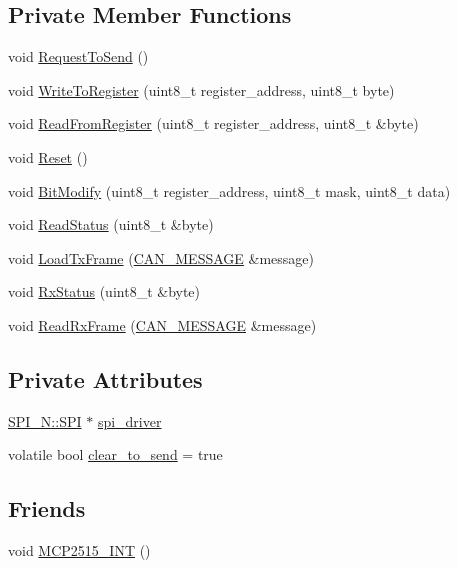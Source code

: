 \subsection*{Private Member Functions}
\begin{DoxyCompactItemize}
\item 
void \hyperlink{class_m_c_p2515_a5a218199ca1dfcb25cb95890bc0220fc}{Request\-To\-Send} ()
\item 
void \hyperlink{class_m_c_p2515_adbc005a5975b77b0aef74363f3832f9b}{Write\-To\-Register} (uint8\-\_\-t register\-\_\-address, uint8\-\_\-t byte)
\item 
void \hyperlink{class_m_c_p2515_a09ef6973daccbf868d89986e727cfa1b}{Read\-From\-Register} (uint8\-\_\-t register\-\_\-address, uint8\-\_\-t \&byte)
\item 
void \hyperlink{class_m_c_p2515_aa4d4138b984dc87116cf72ae104acb70}{Reset} ()
\item 
void \hyperlink{class_m_c_p2515_aa9a35fe139adf1fccaaceec561544c14}{Bit\-Modify} (uint8\-\_\-t register\-\_\-address, uint8\-\_\-t mask, uint8\-\_\-t data)
\item 
void \hyperlink{class_m_c_p2515_ae466f10eea5ccf0f36439757d4baf6b5}{Read\-Status} (uint8\-\_\-t \&byte)
\item 
void \hyperlink{class_m_c_p2515_a37771e54c401a0d11b16599f4a3b85df}{Load\-Tx\-Frame} (\hyperlink{struct_c_a_n___m_e_s_s_a_g_e}{C\-A\-N\-\_\-\-M\-E\-S\-S\-A\-G\-E} \&message)
\item 
void \hyperlink{class_m_c_p2515_af6853f82074a0be19d5a0516a959515e}{Rx\-Status} (uint8\-\_\-t \&byte)
\item 
void \hyperlink{class_m_c_p2515_a2035c6707e66a98d92003a3fc99aa784}{Read\-Rx\-Frame} (\hyperlink{struct_c_a_n___m_e_s_s_a_g_e}{C\-A\-N\-\_\-\-M\-E\-S\-S\-A\-G\-E} \&message)
\end{DoxyCompactItemize}
\subsection*{Private Attributes}
\begin{DoxyCompactItemize}
\item 
\hyperlink{class_s_p_i___n_1_1_s_p_i}{S\-P\-I\-\_\-\-N\-::\-S\-P\-I} $\ast$ \hyperlink{class_m_c_p2515_a3a5ca0d606115f1551a06d871606540e}{spi\-\_\-driver}
\item 
volatile bool \hyperlink{class_m_c_p2515_a1418f0f66d9a57659809192552d5ac37}{clear\-\_\-to\-\_\-send} = true
\end{DoxyCompactItemize}
\subsection*{Friends}
\begin{DoxyCompactItemize}
\item 
void \hyperlink{class_m_c_p2515_a3e97befdad3bb95f1da9cf6ff507febe}{M\-C\-P2515\-\_\-\-I\-N\-T} ()
\end{DoxyCompactItemize}
